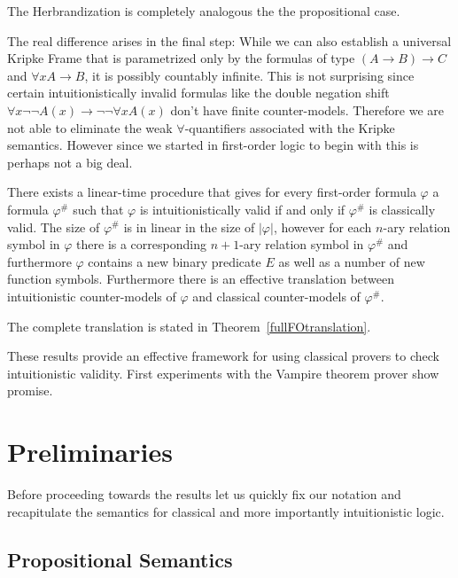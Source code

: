 \documentclass[a4paper,UKenglish,cleveref, autoref, thm-restate]{lipics-v2021}
\begin{document}
The Herbrandization is completely analogous the the propositional case.

The real difference arises in the final step: While we can also establish a universal Kripke Frame that is parametrized only by the formulas of type $(A\to B)\to C$ and $\forall xA\to B$, it is possibly countably infinite. This is not surprising since certain intuitionistically invalid formulas like the double negation shift $\forall x\neg\neg A(x)\to \neg\neg\forall x A(x)$ don't have finite counter-models. Therefore we are not able to eliminate the weak $\forall$-quantifiers associated with the Kripke semantics. However since we started in first-order logic to begin with this is perhaps not a big deal.

\begin{theorem}
	There exists a linear-time procedure that gives for every first-order formula $\varphi$ a formula $\varphi^\#$ such that $\varphi$ is intuitionistically valid if and only if $\varphi^\#$ is classically valid. The size of $\varphi^\#$ is in linear in the size of $|\varphi|$, however for each $n$-ary relation symbol in $\varphi$ there is a corresponding $n+1$-ary relation symbol in $\varphi^\#$ and furthermore $\varphi$ contains a new binary predicate $E$ as well as a number of new function symbols. Furthermore there is an effective translation between intuitionistic counter-models of $\varphi$ and classical counter-models of $\varphi^\#$.
\end{theorem}
The complete translation is stated in Theorem~\ref{fullFOtranslation}.

These results provide an effective framework for using classical provers to check intuitionistic validity. First experiments with the Vampire theorem prover show promise.


\section{Preliminaries}

Before proceeding towards the results let us quickly fix our notation and recapitulate the semantics for classical and more importantly intuitionistic logic.

\subsection{Propositional Semantics}
\end{document}
